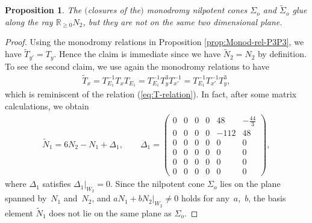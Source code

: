 \documentclass[pdftex]{sigma}
\numberwithin{equation}{section}
\newtheorem{Proposition}[Theorem]{Proposition}
\begin{document}
\begin{Proposition}\label{prop:Glue-P3P3-Tx}The $($closures of the$)$ monodromy nilpotent cones $\Sigma_{o}$ and $\tilde{\Sigma}_{o}$ glue along the ray $\mathbb{R}_{\geq0}N_{2}$, but they are not on the same two dimensional plane. \end{Proposition}
\begin{proof}Using the monodromy relations in Proposition \ref{prop:Monod-rel-P3P3}, we have $\tilde{T}_{y'}=T_{y}$. Hence the claim is immediate since we have $\tilde{N}_{2}=N_{2}$ by definition. To see the second claim, we use again the monodromy relations to have
\begin{gather*}
\tilde{T}_{x}=T_{E_{1}}^{-1}T_{x}T_{E_{1}}=T_{E_{1}}^{-1}T_{y}^{3}T_{x'}^{-1}=T_{E_{1}}^{-1}T_{x'}^{-1}T_{y}^{3},
\end{gather*}
which is reminiscent of the relation (\ref{eq:T-relation}). In fact, after some matrix calculations, we obtain
\begin{gather}
\tilde{N}_{1}=6N_{2}-N_{1}+\Delta_{1},\qquad \Delta_{1}=\left(\begin{smallmatrix}0 & 0 & 0 & 0 & 48 & -\frac{44}{3}\\
0 & 0 & 0 & 0 & -112 & 48\\
0 & 0 & 0 & 0 & 0 & 0\\
0 & 0 & 0 & 0 & 0 & 0\\
0 & 0 & 0 & 0 & 0 & 0\\
0 & 0 & 0 & 0 & 0 & 0
\end{smallmatrix}\right),\label{eq:tildeN1}
\end{gather}
where $\Delta_{1}$ satisfies $\Delta_{1}\vert_{W_{2}}=0$. Since the nilpotent cone $\Sigma_{o}$ lies on the plane spanned by~$N_{1}$ and~$N_{2}$, and $aN_{1}+bN_{2}\vert_{W_{2}}\not=0$ holds for any~$a$,~$b$, the basis element $\tilde{N}_{1}$ does not lie on the same plane as $\Sigma_{o}$.
\end{proof}
\end{document}
